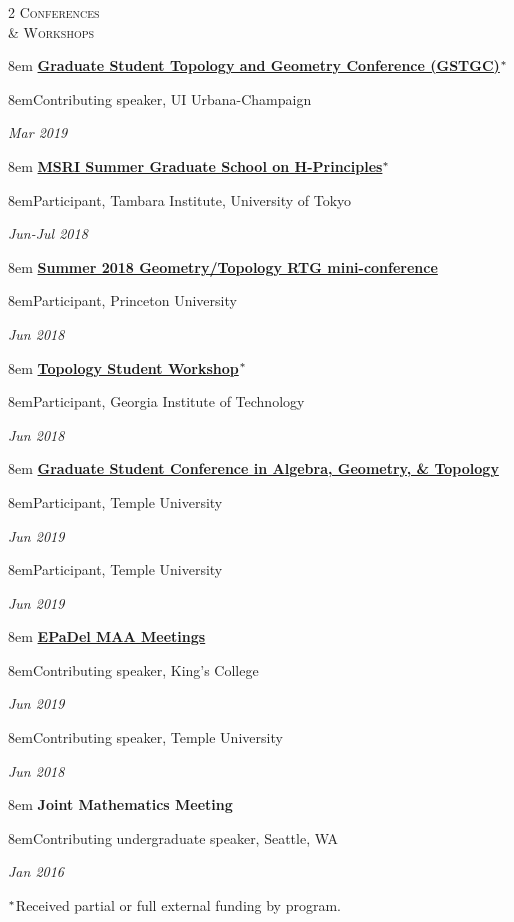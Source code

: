 \documentclass[11pt]{article}
\newcommand{\itemreg}[1]{\begin{addmargin}[0em]{8em} #1 \end{addmargin}}
\newcommand{\iteminddate}[2]{\begin{addmargin}[1.75em]{8em}#1\end{addmargin}\vspace{-1.15em}\hfill\textit{#2}\\}
\begin{document}
\begin{multicols}{2}
	\textsc{Conferences \\ \& Workshops}
	
	\columnbreak
	
	\itemreg{\textbf{\href{https://faculty.math.illinois.edu/~hquan4/GSTGC2019/index.html}{Graduate Student Topology and Geometry Conference (GSTGC)}}$\null^*$}
		\iteminddate{Contributing speaker, UI Urbana-Champaign}{Mar 2019}
		\vspace{.35em}
	
	\itemreg{\textbf{\href{http://www.msri.org/web/msri/scientific/workshops/summer-graduate-school}{MSRI Summer Graduate School on H-Principles}}$\null^*$}
		\iteminddate{Participant, Tambara Institute, University of Tokyo}{Jun-Jul 2018}
		\vspace{.35em}
		
	\itemreg{\textbf{\href{https://web.math.princeton.edu/~petero/RTG/MiniConf1.html}{Summer 2018 Geometry/Topology RTG mini-conference}}}
		\iteminddate{Participant, Princeton University}{Jun 2018}
		\vspace{.35em}
		
	\itemreg{\textbf{\href{http://people.math.gatech.edu/~dmargalit7/tsw18/index.shtml}{Topology Student Workshop}}$\null^*$}
		\iteminddate{Participant, Georgia Institute of Technology}{Jun 2018}
		\vspace{.35em}
		
	\itemreg{\textbf{\href{https://math.temple.edu/events/conferences/gscagt/}{Graduate Student Conference in Algebra, Geometry, \& Topology}}}
			\iteminddate{Participant, Temple University}{Jun 2019}
			\iteminddate{Participant, Temple University}{Jun 2019}
			\vspace{.35em}
			
	\itemreg{\textbf{\href{http://sections.maa.org/epadel/}{EPaDel MAA Meetings}}}
			\iteminddate{Contributing speaker, King's College}{Jun 2019}
			\iteminddate{Contributing speaker, Temple University}{Jun 2018}
			\vspace{.35em}
			
	\itemreg{\textbf{Joint Mathematics Meeting}}
			\iteminddate{Contributing undergraduate speaker, Seattle, WA}{Jan 2016}
			\vspace{.5em}
			
			\hspace{-0em}$\null^*${\footnotesize{Received partial or full external funding by program.}}
\end{multicols}
\vspace{-.5em}
\end{document}
